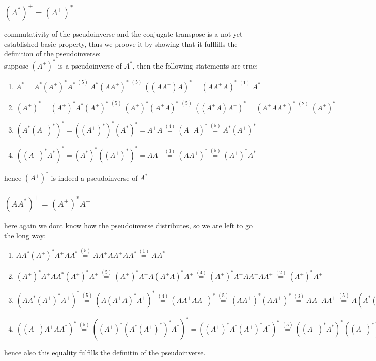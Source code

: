 \documentclass[a4paper,10pt]{article}
\begin{document}
\subsubsection{$(A^*)^+ = (A^+)^*$ }
commutativity of the pseudoinverse and the conjugate transpose is a not yet established basic property, thus we proove it by showing that it fullfills the definition of the pseudoinverse:\\
suppose $(A^+)^*$ is a pseudoinverse of $A^*$, then the following statements are true:
\begin{enumerate}
	\item $A^*=A^*(A^+)^*A^*\stackrel{(5)}{=} A^*(AA^+)^*\stackrel{(5)}{=} \left( (AA^+)A \right)^*= (AA^+A)^*\stackrel{(1)}{=} A^*$
	\item $(A^+)^*=(A^+)^*A^*(A^+)^* \stackrel{(5)}{=} (A^+)^*\left( A^+A \right)^*\stackrel{(5)}{=} \left( (A^+A)A^+ \right)^*=(A^+AA^+)^*\stackrel{(2)}{=} (A^+)^*$
	\item$ \left( A^*(A^+)^* \right)^*=\left( (A^+)^* \right)^*(A^*)^*=A^+A \stackrel{(4)}{=} (A^+A)^*\stackrel{(5)}{=} A^*(A^+)^*$
	\item$ \left( (A^+)^*A^* \right)^*=(A^*)^*\left( (A^+)^* \right)^*=AA^+ \stackrel{(3)}{=} (AA^+)^*\stackrel{(5)}{=} (A^+)^*A^*$
\end{enumerate}
hence $(A^+)^*$ is indeed a pseudoinverse of $A^*$
\subsubsection{$(AA^*)^+=(A^+)^*A^+$}
\label{sub:$(AA^*)^+=(A^+)^*A^+$}
here again we dont know how the pseudoinverse distributes, so we are left to go the long way:\\
\begin{enumerate}
	\item$ AA^* (A^+)^*A^+ AA^* \stackrel{(5)}{=} A A^+ A A^+ A A^* \stackrel{(1)}{=} A A^*$
	\item$ (A^+)^*A^+ AA^* (A^+)^*A^+ \stackrel{(5)}{=} (A^+)^* A^+ A (A^+ A)^* A^+ \stackrel{(4)}{=}
		(A^+)^* A^+ A A^+ A A^+ \stackrel{(2)}{=} (A^+)^* A^+$
	\item $(A A^* (A^+)^* A^+)^*\stackrel{(5)}{=}(A(A^+A)^*A^+)^*\stackrel{(4)}{=} (AA^+AA^+)^*\stackrel{(5)}{=}
		(AA^+)^*(AA^+)^* \stackrel{(3)}{=}AA^+AA^+\stackrel{(5)}{=} A(A^*(A^+)^*)^*A^+=A(A^*(A^*)^+)^*A^+\stackrel{(3)}{=}
		AA^*(A^*)^+A^+=AA^*(A^+)^*A^+$
	\item $ ((A^+)A^+AA^*)^*\stackrel{(5)}{=}((A^+)^*(A^*(A^+)^*)^*A^*)^*=( (A^+)^*A^*(A^+)^*A^*)^* \stackrel{(5)}{=}( (A^+)^*A^*)^*( (A^+)^*)^*
		\stackrel{(4)}{=} (A^+)^*A^*(A^+)^*A^* \stackrel{(5)}{=}(A^+)^*(A^+A)^*A^*=(A^+)^*A^+AA^* $
\end{enumerate}
hence also this equality fulfills the definitin of the pseudoinverse.
\end{document}
